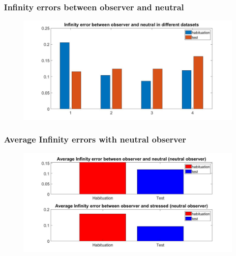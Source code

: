 \documentclass{beamer}
\begin{document}
\begin{frame}
\frametitle{Infinity errors between observer and neutral}



\begin{figure}[H]
\begin{center}
	\hspace*{-1.7cm}
	\includegraphics[scale=.32]{inf_erro_neut.jpg} 
\end{center}  


\end{figure}

\end{frame}

\begin{frame}
\frametitle{Average Infinity errors with neutral observer}

\begin{figure}[H]
	\begin{center}
		\hspace*{-1.7cm}
		\includegraphics[scale=.32]{avg_inf.jpg} 
	\end{center}  
	
	
\end{figure}


\end{frame}
\end{document}
